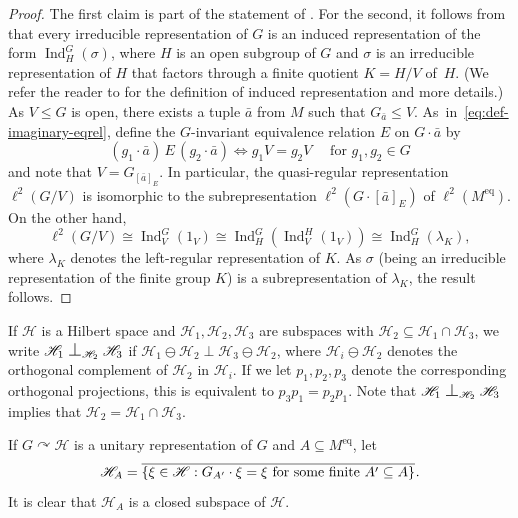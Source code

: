 \documentclass[11pt]{article}
\let\mathcal\mathscr
\let\actson\curvearrowright
\let\sub\subseteq
\theoremstyle{plain}
\theoremstyle{definition}
\newcommand{\cH}{\mathcal{H}}
\DeclareMathOperator{\Ind}{Ind}
\DeclarePairedDelimiter\set{\{}{\}}
\newcommand{\eq}{^{\mathrm{eq}}}
\newcommand{\cl}[2][]{\overline{#2}^{#1}}
\newcommand{\eqrel}[1]{\,#1\,}
\newcommand{\Perp}[1][]{\mathrel{
\mathop{
\scalebox{1.3}{\text{$\perp$}}
}\displaylimits_{#1}}}
\begin{document}
\begin{proof}
The first claim is part of the statement of \cite[Th.\,4.2]{Tsankov2012}. For the second, it follows from \cite[Th.\,4.2]{Tsankov2012} that every irreducible representation of $G$ is an induced representation of the form $\Ind_H^G(\sigma)$, where $H$ is an open subgroup of $G$ and $\sigma$ is an irreducible representation of $H$ that factors through a finite quotient $K = H/V$ of~$H$. (We refer the reader to \cite{Tsankov2012} for the definition of induced representation and more details.) As $V \leq G$ is open, there exists a tuple $\bar a$ from $M$ such that $G_{\bar a} \leq V$. As~in~\eqref{eq:def-imaginary-eqrel}, define the $G$-invariant equivalence relation $E$ on $G \cdot \bar a$ by
\begin{equation*}
(g_1 \cdot \bar a) \eqrel{E} (g_2 \cdot \bar a) \iff g_1V = g_2V \quad \text{ for } g_1, g_2 \in G
\end{equation*}
and note that $V = G_{[\bar a]_E}$. In particular, the quasi-regular representation $\ell^2(G/V)$ is isomorphic to the subrepresentation $\ell^2(G \cdot [\bar a]_E)$ of $\ell^2(M\eq)$. On the other hand,
\begin{equation*}
\ell^2(G/V) \cong \Ind_V^G(1_V) \cong \Ind_H^G(\Ind_V^H(1_V)) \cong \Ind_H^G(\lambda_K),
\end{equation*}
where $\lambda_K$ denotes the left-regular representation of $K$. As $\sigma$ (being an irreducible representation of the finite group $K$) is a subrepresentation of $\lambda_K$, the result follows.
\end{proof}

If $\cH$ is a Hilbert space and $\cH_1, \cH_2, \cH_3$ are subspaces with $\cH_2 \sub \cH_1 \cap \cH_3$, we write $\cH_1 \Perp[\cH_2] \cH_3$ if $\cH_1 \ominus \cH_2 \perp \cH_3 \ominus \cH_2$, where $\cH_i \ominus \cH_2$ denotes the orthogonal complement of $\cH_2$ in $\cH_i$.
If we let $p_1, p_2, p_3$ denote the corresponding orthogonal projections, this is equivalent to $p_3 p_1 = p_2 p_1$. Note that $\cH_1 \Perp[\cH_2] \cH_3$ implies that $\cH_2 = \cH_1 \cap \cH_3$.

If $G \actson \cH$ is a unitary representation of $G$ and $A \sub M\eq$, let
\begin{equation}
\label{eq:defHA}
\cH_A = \cl{\set{\xi \in \cH : G_{A'} \cdot \xi = \xi \text{ for some finite } A' \sub A}}.
\end{equation}
It is clear that $\cH_A$ is a closed subspace of $\cH$.
\end{document}
